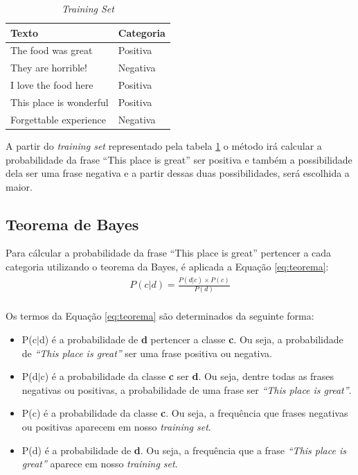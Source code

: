 \begin{table}[htb]
\centering
\begin{tabular}{|l|l|}
\hline
Texto  & Categoria \\ \hline
The food was great  & Positiva     \\ \hline
They are horrible!    & Negativa     \\ \hline
I love the food here  & Positiva     \\ \hline
This place is wonderful  & Positiva     \\ \hline
Forgettable experience  & Negativa     \\ \hline
\end{tabular}
\caption{\textit{Training Set}}
\label{tab:trainingsetnb}
\end{table}

A partir do \textit{training set} representado pela tabela
\ref{tab:trainingsetnb} o método irá calcular a probabilidade da frase ``This
place is great'' ser positiva e também a possibilidade dela ser uma frase
negativa e a partir dessas duas possibilidades, será escolhida a maior.


\subsection{Teorema de Bayes}

Para cálcular a probabilidade da frase ``This place is great'' pertencer a cada categoria
utilizando o teorema da Bayes, é aplicada a Equação \ref{eq:teorema}:
\begin{equation}
\begin{gathered}
P(c|d) = \frac{P(d|c) \times P(c)}{P(d)} \\
\label{eq:teorema}
\end{gathered}
\end{equation}

Os termos da Equação \ref{eq:teorema} são determinados da seguinte forma:
\begin{itemize}
  \item P(c$\vert$d) é a probabilidade de \textbf{d} pertencer a classe
  \textbf{c}. Ou seja, a probabilidade de \textit{``This place is great''} ser
  uma frase positiva ou negativa.
  \item P(d$\vert$c) é a probabilidade da classe \textbf{c} ser \textbf{d}. Ou
  seja, dentre todas as frases negativas ou positivas, a probabilidade de
  uma frase ser \textit{``This place is great''}.
  \item P(c) é a probabilidade da classe \textbf{c}. Ou seja, a frequência que
  frases negativas ou positivas aparecem em nosso \textit{training
  set}.
  \item P(d) é a probabilidade de \textbf{d}. Ou seja, a frequência que
  a frase \textit{``This place is great''} aparece em nosso \textit{training
  set}.
\end{itemize}

